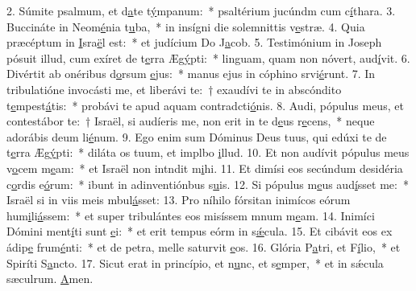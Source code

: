 2. Súmite psalmum, et d\uline{a}te t\uline{ý}mpanum:~* psaltérium jucúndm cum c\uline{í}thara.
3. Buccináte in Neom\uline{é}nia t\uline{u}ba,~* in insígni die solemnittis v\uline{e}stræ.
4. Quia præcéptum in \uline{I}sra\uline{ë}l est:~* et judícium Do J\uline{a}cob.
5. Testimónium in Joseph pósuit illud, cum exíret de t\uline{e}rra Æg\uline{ý}pti:~* linguam, quam non nóvert, aud\uline{í}vit.
6. Divértit ab onéribus d\uline{o}rsum \uline{e}jus:~* manus ejus in cóphino srvi\uline{é}runt.
7. In tribulatióne invocásti me, et liberávi te:~† exaudívi te in abscóndito t\uline{e}mpest\uline{á}tis:~* probávi te apud aquam contradcti\uline{ó}nis.
8. Audi, pópulus meus, et contestábor te:~† Israël, si audíeris me, non erit in te d\uline{e}us r\uline{e}cens,~* neque adorábis deum li\uline{é}num.
9. Ego enim sum Dóminus Deus tuus, qui edúxi te de t\uline{e}rra Æg\uline{ý}pti:~* diláta os tuum, et implbo \uline{i}llud.
10. Et non audívit pópulus meus v\uline{o}cem m\uline{e}am:~* et Israël non intndit m\uline{i}hi.
11. Et dimísi eos secúndum desidéria c\uline{o}rdis e\uline{ó}rum:~* ibunt in adinventiónbus s\uline{u}is.
12. Si pópulus m\uline{e}us aud\uline{í}sset me:~* Israël si in viis meis mbul\uline{á}sset:
13. Pro níhilo fórsitan inimícos eórum hum\uline{i}li\uline{á}ssem:~* et super tribulántes eos misíssem mnum m\uline{e}am.
14. Inimíci Dómini ment\uline{í}ti sunt \uline{e}i:~* et erit tempus eórm in s\uline{ǽ}cula.
15. Et cibávit eos ex ádip\uline{e} frum\uline{é}nti:~* et de petra, melle saturvit \uline{e}os.
16. Glória P\uline{a}tri, et F\uline{í}lio,~* et Spiríti S\uline{a}ncto.
17. Sicut erat in princípio, et n\uline{u}nc, et s\uline{e}mper,~* et in sǽcula sæculrum. \uline{A}men.
